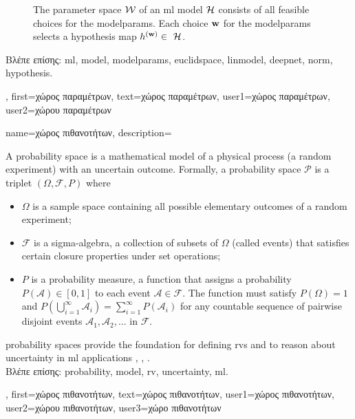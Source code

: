 {{\begin{figure}[H]
\begin{center}
			\end{center} 
			\caption{The parameter space $\mathcal{W}$ of an \gls{ml} \gls{model} $\mathcal{H}$ consists of all 
			feasible choices for the \gls{modelparams}. Each choice ${\bf w}$ for the \gls{modelparams} 
			selects a \gls{hypothesis} map $\hypothesis^{(\weights)} \in \hypospace$.
				 \label{fig_param_space_dict}} 
\end{figure}
\foreignlanguage{greek}{Βλέπε επίσης:} \gls{ml}, \gls{model}, \gls{modelparams}, \gls{euclidspace}, \gls{linmodel}, \gls{deepnet}, \gls{norm}, \gls{hypothesis}.},
			first={\foreignlanguage{greek}{χώρος παραμέτρων}},
			text={\foreignlanguage{greek}{χώρος παραμέτρων}},
			user1={\foreignlanguage{greek}{χώρος παραμέτρων}}, %
			user2={\foreignlanguage{greek}{χώρου παραμέτρων}} %
}

 {name={\foreignlanguage{greek}{χώρος πιθανοτήτων}}, 
 	description={A \gls{probability} space is a mathematical 
 		\gls{model} of a physical process (a random experiment) with an uncertain outcome. 
 	   	Formally, a \gls{probability} space $\mathcal{P}$ is a triplet $(\Omega, \mathcal{F}, P)$ where
 		\begin{itemize} 
 		\item  $\Omega$ is a \gls{sample} space containing all possible elementary outcomes of a random experiment;
 		\item  $\mathcal{F}$ is a sigma-algebra, a collection of subsets of $\Omega$ (called events) that satisfies 
 		certain closure properties under set operations;
 		\item $P$ is a \gls{probability} measure, a function that assigns a \gls{probability} $P(\mathcal{A}) \in [0,1]$ 
 		to each event $\mathcal{A} \in \mathcal{F}$. The function must satisfy $P(\Omega) = 1$ and 	$
 		P\left(\bigcup_{i=1}^{\infty} \mathcal{A}_i\right) = \sum_{i=1}^{\infty} P(\mathcal{A}_i)$ for any 
 		countable sequence of pairwise disjoint events $\mathcal{A}_1, \mathcal{A}_2, \dots$ in $\mathcal{F}$.
 		\end{itemize}
 		\Gls{probability} spaces provide the foundation for defining \gls{rv}s and to reason about 
 		\gls{uncertainty} in \gls{ml} applications \cite{GrayProbBook}, \cite{BillingsleyProbMeasure}, \cite{ross2013first}.\\
		\foreignlanguage{greek}{Βλέπε επίσης:} \gls{probability}, \gls{model}, \gls{rv}, \gls{uncertainty}, \gls{ml}.},  
 	first={\foreignlanguage{greek}{χώρος πιθανοτήτων}}, 
 	text={\foreignlanguage{greek}{χώρος πιθανοτήτων}},
	user1={\foreignlanguage{greek}{χώρος πιθανοτήτων}}, %
  	user2={\foreignlanguage{greek}{χώρου πιθανοτήτων}}, %
	user3={\foreignlanguage{greek}{χώρο πιθανοτήτων}} %
 }

